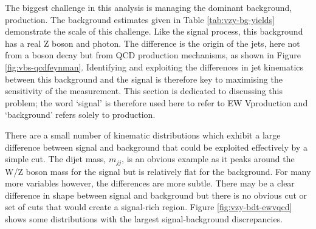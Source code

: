 
The biggest challenge in this analysis is managing the dominant background,
\QCDZy production. The background estimates given in Table
\ref{tab:vzy-bg-yields} demonstrate the scale of this challenge.
Like the signal process, this background has a real Z
boson and photon. The difference is the origin of the jets, here not from a
boson decay but from \ac{QCD} production mechanisms, as shown in Figure
\ref{fig:vbs-qcdfeynman}.
%
Identifying and exploiting the differences in jet kinematics between this
background and the signal is therefore key to maximising the sensitivity of the
measurement. This section is dedicated to discussing this problem; the word
`signal' is therefore used here to refer to \ac{EW} V\Zy production and `background'
refers solely to \QCDZy production.


There are a small number of kinematic distributions which exhibit a large
difference between signal and background that could be exploited effectively by
a simple cut. The dijet mass, $m_{jj}$, is an obvious example as it
peaks around the W/Z boson mass for the signal but is relatively flat for the
background.
%
For many more variables however, the differences are more subtle. There may be
a clear difference in shape between signal and background
but there is no obvious cut or set of cuts that would create a signal-rich
region. Figure \ref{fig:vzy-bdt-ewvqcd} shows some distributions with the
largest signal-background discrepancies.


